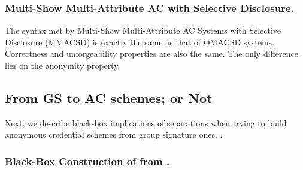 \subsubsection{Multi-Show Multi-Attribute AC with Selective Disclosure.} %
The syntax met by Multi-Show Multi-Attribute AC Systems with Selective
Disclosure (MMACSD) is exactly the same as that of OMACSD systems. Correctness
and unforgeability properties are also the same. The only difference lies on
the anonymity property.

\subsection{From GS to AC schemes; or Not}
\label{ssec:gs2ac}

Next, we describe black-box implications of separations when trying to build
anonymous credential schemes from group signature ones. .

\subsubsection{Black-Box Construction of \OMACSD from \PDGS.} %

